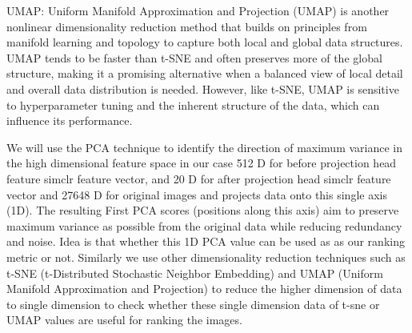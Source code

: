 UMAP: Uniform Manifold Approximation and Projection (UMAP) is another nonlinear dimensionality reduction method that builds on principles from manifold learning and topology to capture both local and global data structures. UMAP tends to be faster than t-SNE and often preserves more of the global structure, making it a promising alternative when a balanced view of local detail and overall data distribution is needed. However, like t-SNE, UMAP is sensitive to hyperparameter tuning and the inherent structure of the data, which can influence its performance.

We will use the PCA technique to identify the direction of maximum variance in the high dimensional feature space in our case 512 D for before projection head feature simclr feature vector, and 20 D for after projection head simclr feature vector and 27648 D for original images and projects data onto this single axis (1D). The resulting First PCA scores (positions along this axis) aim to preserve maximum variance as possible from the original data while reducing redundancy and noise.  Idea is that whether this 1D PCA value can be used as as our ranking metric or not. Similarly we use other dimensionality reduction techniques such as  t-SNE (t-Distributed Stochastic Neighbor Embedding)  and UMAP (Uniform Manifold Approximation and Projection) to reduce the higher dimension of data to single dimension to check whether these single dimension data of t-sne or UMAP values are useful for ranking  the images. 
